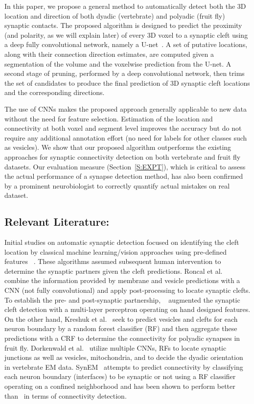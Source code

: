 \documentclass{llncs}
\begin{document}
In this paper, we propose a general method to automatically detect both the 3D location and direction of both dyadic (vertebrate) and polyadic (fruit fly) synaptic contacts. The proposed algorithm is designed to predict the proximity (and polarity, as we will explain later) of every 3D voxel to a synaptic cleft using a deep fully convolutional network, namely a U-net~\cite{ronneberger15unet}. A set of putative locations, along with their connection direction estimates, are computed given a segmentation of the volume and the voxelwise prediction from the U-net. A second stage of pruning, performed by a deep convolutional network, then trims the set of candidates to produce the final prediction of 3D synaptic cleft locations and the corresponding directions. 

The use of CNNs makes the proposed approach generally applicable to new data without the need for feature selection. Estimation of the location and connectivity at both voxel and segment level improves the accuracy but do not require any additional annotation effort (no need for labels for other classes such as vesicles). We show that our proposed algorithm outperforms the existing approaches for synaptic connectivity detection on both vertebrate and fruit fly datasets. Our evaluation measure (Section~\ref{S:EXPT}), which is critical to assess the actual performance of a synapse detection method, has also been confirmed by a prominent neurobiologist to correctly quantify actual mistakes on real dataset. 


\subsection{Relevant Literature:} Initial studies on automatic synaptic detection focused on identifying the cleft location by classical machine learning/vision approaches using pre-defined features~\cite{kreshuk11plos}\cite{becker13syn}\cite{kreshuk14plos} \cite{plaza14syn}\cite{jagadeesh14}\cite{huang14syn}. These algorithms assumed subsequent human intervention to determine the synaptic partners given the cleft predictions. Roncal et al.~\cite{roncal14vesicle} combine the information provided by membrane and vesicle predictions with a CNN (not fully convolutional) and apply post-processing to locate synaptic clefts.  To establish the pre- and post-synaptic partnership, ~\cite{huang16} augmented the synaptic cleft detection with a multi-layer perceptron operating on hand designed features. On the other hand, Kreshuk et al.~\cite{kreshuk15miccai} seek to predict vesicles and clefts for each neuron boundary by a random forest classifier (RF) and then aggregate these predictions with a CRF to determine the connectivity for polyadic synapses in fruit fly. Dorkenwald et al.~\cite{dorkenwald17syconn} utilize multiple CNNs, RFs to locate synaptic junctions as well as vesicles, mitochondria, and to decide the dyadic orientation in vertebrate EM data. SynEM~\cite{staffler17synem} attempts to predict connectivity by classifying each neuron boundary (interfaces) to be synaptic or not using a RF classifier operating on a confined neighborhood and has been shown to perform better than~\cite{dorkenwald17syconn} in terms of connectivity detection.
\end{document}
